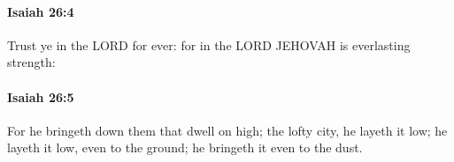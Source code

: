 		\paragraph{Isaiah 26:4} %
			\label{ISAIAH-26-4}

			Trust ye in the LORD for ever: for in the LORD JEHOVAH is everlasting strength:


		\paragraph{Isaiah 26:5} %
			\label{ISAIAH-26-5}

			For he bringeth down them that dwell on high; the lofty city, he layeth it low; he layeth it low, even to the ground; he bringeth it even to the dust.


